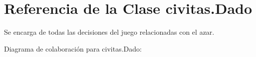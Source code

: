 \hypertarget{classcivitas_1_1Dado}{}\section{Referencia de la Clase civitas.\+Dado}
\label{classcivitas_1_1Dado}


Se encarga de todas las decisiones del juego relacionadas con el azar.  




Diagrama de colaboración para civitas.\+Dado\+:
